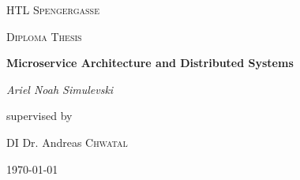 \documentclass[12pt,a4paper]{report}
\begin{document}
\begin{titlepage}
	\centering
	{\scshape\LARGE HTL Spengergasse \par}
	\vspace{1cm}
	{\scshape\Large Diploma Thesis\par}
	\vspace{1.5cm}
	{\huge\bfseries Microservice Architecture and Distributed Systems\par}
	\vspace{2cm}
	{\Large\itshape Ariel Noah Simulevski\par}
	\vfill
	supervised by\par
	DI Dr. Andreas \textsc{Chwatal}

	\vfill

	{\large \today\par}
\end{titlepage}
\end{document}
